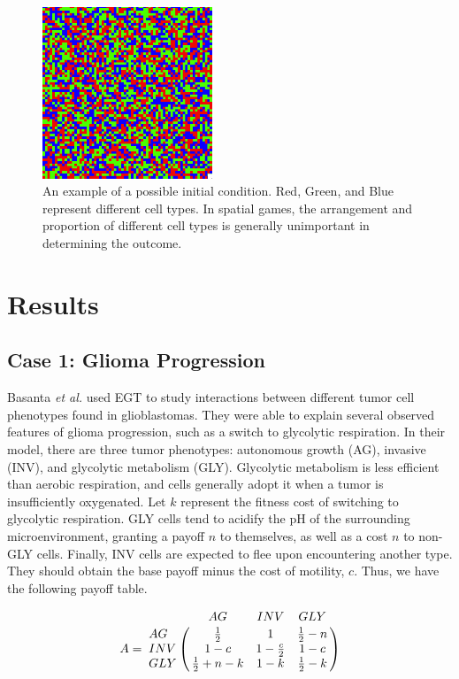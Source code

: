 \documentclass[12pt]{amsart}
\begin{document}
\begin{figure}[t]
\caption{An example of a possible initial condition. Red, Green, and Blue represent different cell types. In spatial games, the arrangement and proportion of different cell types is generally unimportant in determining the outcome.}
\centering
\includegraphics[width = 2in]{Diagrams/General/even_random_mix}
\end{figure}

\section{Results}


\subsection{Case 1: Glioma Progression}
Basanta \textit{et al.} used EGT to study interactions between different tumor cell phenotypes found in glioblastomas. They were able to explain several observed features of glioma progression, such as a switch to glycolytic respiration. In their model, there are three tumor phenotypes: autonomous growth (AG), invasive (INV), and glycolytic metabolism (GLY). Glycolytic metabolism is less efficient than aerobic respiration, and cells generally adopt it when a tumor is insufficiently oxygenated. Let $k$ represent the fitness cost of switching to glycolytic respiration. GLY cells tend to acidify the pH of the surrounding microenvironment, granting a payoff $n$ to themselves, as well as a cost $n$ to non-GLY cells. Finally, INV cells are expected to flee upon encountering another type. They should obtain the base payoff minus the cost of motility, $c$. Thus, we have the following payoff table. 

$$A = \bordermatrix{\text{}& AG & INV & GLY\cr
                AG & \frac{1}{2} & 1 & \frac{1}{2} - n \cr
                INV & 1 - c  &  1 - \frac{c}{2} & 1 - c \cr
                GLY & \frac{1}{2}+n-k & 1-k & \frac{1}{2}-k \cr
               }$$
\end{document}
